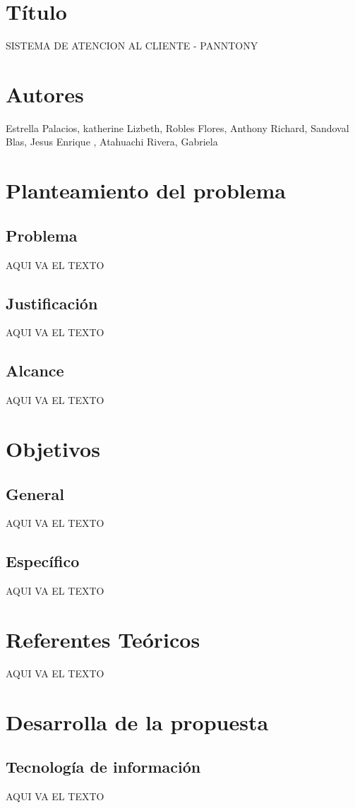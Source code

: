 \documentclass[preprint,12pt]{elsarticle}
\begin{document}
\section{Título}
SISTEMA DE ATENCION AL CLIENTE - PANNTONY

\section{Autores}
Estrella Palacios, katherine Lizbeth,
Robles Flores, Anthony Richard,
Sandoval Blas, Jesus Enrique      ,   
Atahuachi Rivera, Gabriela           

\section{Planteamiento del problema}
	\subsection{Problema }	
		AQUI VA EL TEXTO
	\subsection{Justificación }	
		AQUI VA EL TEXTO
	\subsection{Alcance }
		AQUI VA EL TEXTO	

\section{Objetivos}
	\subsection{General }	
		AQUI VA EL TEXTO
	\subsection{Específico }	
		AQUI VA EL TEXTO

\section{Referentes Teóricos}
AQUI VA EL TEXTO

\section{Desarrolla de la propuesta}
	\subsection{Tecnología de información }	
		AQUI VA EL TEXTO
\end{document}
